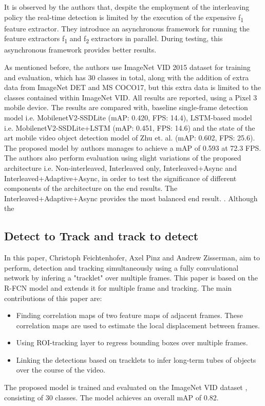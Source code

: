 \documentclass[conference]{IEEEtran}
\begin{document}
It is observed by the authors that, despite the employment of the interleaving policy the real-time detection is limited by the execution of the expensive f\textsubscript{1} feature extractor. They introduce an asynchronous framework for running the feature extractors f\textsubscript{1} and f\textsubscript{2} extractors in parallel. During testing, this asynchronous framework provides better results. \newline

As mentioned before, the authors use ImageNet VID 2015 dataset for training and evaluation, which has 30 classes in total, along with the addition of extra data from ImageNet DET and MS COCO17, but this extra data is limited to the classes contained within ImageNet VID. All results are reported, using a Pixel 3 mobile device. The results are compared with, baseline single-frame detection model i.e. MobilenetV2-SSDLite (mAP: 0.420, FPS: 14.4), LSTM-based model i.e. MobilenetV2-SSDLite+LSTM (mAP: 0.451, FPS: 14.6) and the state of the art mobile video object detection model of Zhu et. al. (mAP: 0.602, FPS: 25.6). The proposed model by authors manages to achieve a mAP of 0.593 at 72.3 FPS. The authors also perform evaluation using slight variations of the proposed architecture i.e. Non-interleaved, Interleaved only, Interleaved+Async and Interleaved+Adaptive+Async, in order to test the significance of different components of the architecture on the end results. The Interleaved+Adaptive+Async provides the most balanced end result. \cite{b37}. Although the 

\subsection{Detect to Track and track to detect\cite{b8}}

In this paper, Christoph Feichtenhofer, Axel Pinz and Andrew Zisserman, aim to perform, detection and tracking simultaneously using a fully convulational network by infering a "tracklet" over multiple frames.  This paper is based on the R-FCN\cite{b19} model and extends it for multiple frame and tracking. The main contributions of this paper are:
\begin{itemize}
	\item Finding correlation maps of two feature maps of adjacent frames. These correlation maps are used to estimate the local displacement between frames.
	\item Using ROI-tracking layer to regress bounding boxes over multiple frames.
	\item Linking the detections based on tracklets to infer long-term tubes of objects over the course of the video.
\end{itemize}
The proposed model is trained and evaluated on the ImageNet VID dataset \cite{b35}, consisting of 30 classes. The model achieves an overall mAP of 0.82. \newline
\end{document}
